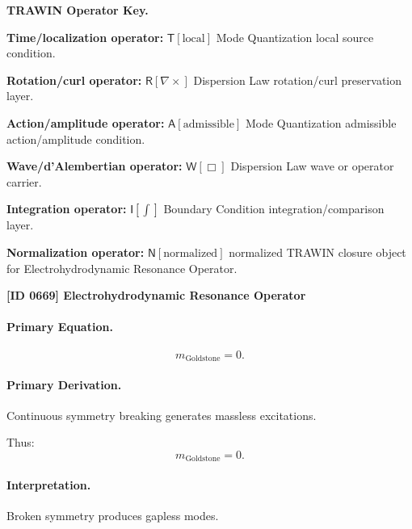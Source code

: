 \par\vspace{0.45\baselineskip}
\noindent\begin{minipage}[t]{\linewidth}
\begingroup
\small
\raggedright
\textbf{TRAWIN Operator Key.}\par
\noindent\textbf{Time/localization operator:} $\mathsf{T}\!\left[\mathrm{local}\right]$ Mode Quantization local source condition.\par
\noindent\textbf{Rotation/curl operator:} $\mathsf{R}\!\left[\nabla\times\right]$ Dispersion Law rotation/curl preservation layer.\par
\noindent\textbf{Action/amplitude operator:} $\mathsf{A}\!\left[\mathrm{admissible}\right]$ Mode Quantization admissible action/amplitude condition.\par
\noindent\textbf{Wave/d'Alembertian operator:} $\mathsf{W}\!\left[\Box\right]$ Dispersion Law wave or operator carrier.\par
\noindent\textbf{Integration operator:} $\mathsf{I}\!\left[\int\right]$ Boundary Condition integration/comparison layer.\par
\noindent\textbf{Normalization operator:} $\mathsf{N}\!\left[\mathrm{normalized}\right]$ normalized TRAWIN closure object for Electrohydrodynamic Resonance Operator.\par
\endgroup
\end{minipage}

\clearpage
\noindent\textbf{[ID 0669] Electrohydrodynamic Resonance Operator}\par
\vspace{0.35em}
\paragraph{Primary Equation.}
\begin{equation}
m_{\mathrm{Goldstone}} = 0.
\end{equation}

\paragraph{Primary Derivation.}
Continuous symmetry breaking generates massless excitations.

Thus:
\begin{equation}
\boxed{
m_{\mathrm{Goldstone}} = 0.
}
\end{equation}

\paragraph{Interpretation.}
Broken symmetry produces gapless modes.

